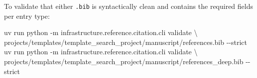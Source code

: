\documentclass[
  english,
]{article}
\newenvironment{Shaded}{}{}
\newcommand{\AttributeTok}[1]{\textcolor[rgb]{0.49,0.56,0.16}{#1}}
\newcommand{\DataTypeTok}[1]{\textcolor[rgb]{0.56,0.13,0.00}{#1}}
\newcommand{\ExtensionTok}[1]{#1}
\newcommand{\NormalTok}[1]{#1}
\begin{document}
To validate that either \texttt{.bib} is syntactically clean and
contains the required fields per entry type:

\begin{Shaded}
\begin{Highlighting}[]
\ExtensionTok{uv}\NormalTok{ run python }\AttributeTok{{-}m}\NormalTok{ infrastructure.reference.citation.cli validate }\DataTypeTok{\textbackslash{}}
\NormalTok{    projects/templates/template\_search\_project/manuscript/references.bib }\AttributeTok{{-}{-}strict}
\ExtensionTok{uv}\NormalTok{ run python }\AttributeTok{{-}m}\NormalTok{ infrastructure.reference.citation.cli validate }\DataTypeTok{\textbackslash{}}
\NormalTok{    projects/templates/template\_search\_project/manuscript/references\_deep.bib }\AttributeTok{{-}{-}strict}
\end{Highlighting}
\end{Shaded}




\clearpage


\end{document}

